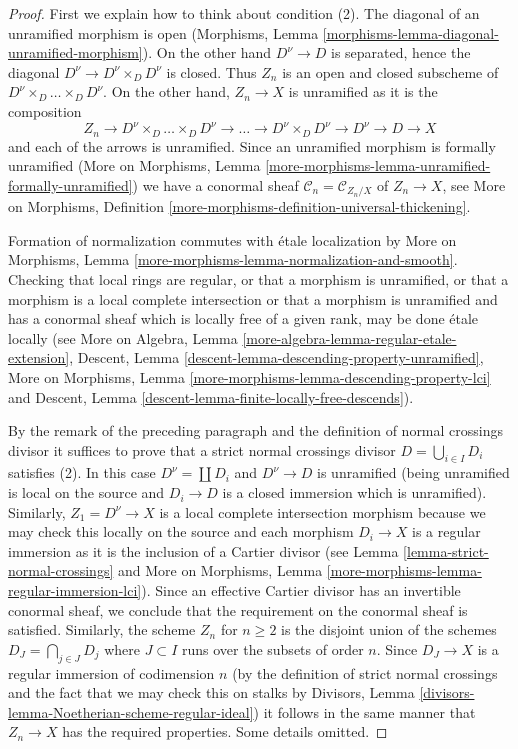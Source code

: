 \begin{proof}
First we explain how to think about condition (2).
The diagonal of an unramified morphism is open
(Morphisms, Lemma \ref{morphisms-lemma-diagonal-unramified-morphism}).
On the other hand $D^\nu \to D$ is separated, hence the
diagonal $D^\nu \to D^\nu \times_D D^\nu$ is closed.
Thus $Z_n$ is an open and closed subscheme of
$D^\nu \times_D \ldots \times_D D^\nu$. On the other hand,
$Z_n \to X$ is unramified as it is the composition
$$
Z_n \to D^\nu \times_D \ldots \times_D D^\nu \to \ldots \to
D^\nu \times_D D^\nu \to D^\nu \to D \to X
$$
and each of the arrows is unramified.
Since an unramified morphism is formally unramified
(More on Morphisms, Lemma
\ref{more-morphisms-lemma-unramified-formally-unramified})
we have a conormal sheaf
$\mathcal{C}_n = \mathcal{C}_{Z_n/X}$ of $Z_n \to X$, see
More on Morphisms, Definition
\ref{more-morphisms-definition-universal-thickening}.

\medskip\noindent
Formation of normalization commutes with \'etale localization by
More on Morphisms, Lemma \ref{more-morphisms-lemma-normalization-and-smooth}.
Checking that local rings are regular, or that
a morphism is unramified, or that a morphism is a
local complete intersection or that a morphism is
unramified and has a conormal sheaf which is
locally free of a given rank, may be done \'etale locally (see
More on Algebra, Lemma \ref{more-algebra-lemma-regular-etale-extension},
Descent, Lemma \ref{descent-lemma-descending-property-unramified},
More on Morphisms, Lemma \ref{more-morphisms-lemma-descending-property-lci}
and
Descent, Lemma \ref{descent-lemma-finite-locally-free-descends}).

\medskip\noindent
By the remark of the preceding paragraph and the definition
of normal crossings divisor it suffices to prove that a
strict normal crossings divisor $D = \bigcup_{i \in I} D_i$
satisfies (2). In this case $D^\nu = \coprod D_i$
and $D^\nu \to D$ is unramified (being unramified
is local on the source and $D_i \to D$ is a closed
immersion which is unramified). Similarly, $Z_1 = D^\nu \to X$
is a local complete intersection morphism because we may
check this locally on the source and each morphism $D_i \to X$
is a regular immersion as it is the inclusion of a Cartier divisor
(see Lemma \ref{lemma-strict-normal-crossings} and
More on Morphisms, Lemma \ref{more-morphisms-lemma-regular-immersion-lci}).
Since an effective Cartier divisor has an invertible
conormal sheaf, we conclude that the requirement on the
conormal sheaf is satisfied.
Similarly, the scheme $Z_n$ for $n \geq 2$ is the disjoint union
of the schemes $D_J = \bigcap_{j \in J} D_j$ where $J \subset I$
runs over the subsets of order $n$. Since $D_J \to X$ is
a regular immersion of codimension $n$
(by the definition of strict normal crossings and the
fact that we may check this on stalks by
Divisors, Lemma \ref{divisors-lemma-Noetherian-scheme-regular-ideal})
it follows in the same manner that $Z_n \to X$ has the required
properties. Some details omitted.


\end{proof}
